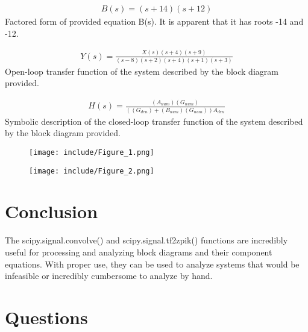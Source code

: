 \documentclass[12pt]{article}
\begin{document}
\begin{equation}
\begin{split}
B(s) = (s+14)(s+12)
\end{split}
\end{equation}
Factored form of provided equation B(s). It is apparent that it has roots -14 and -12.

\begin{equation}
\begin{split}
Y(s) = \frac{X(s)(s+4)(s+9)}{(s-8)(s+2)(s+4)(s+1)(s+3)}
\end{split}
\end{equation}
Open-loop transfer function of the system described by the block diagram provided.

\begin{equation}
\begin{split}
H(s) = \frac{(A_{num})(G_{num})}{( (G_{den}) + (B_{num})(G_{num}))A_{den}}
\end{split}
\end{equation}
Symbolic description of the closed-loop transfer function of the system described by the block diagram provided.

    \begin{figure}[hbt!]
        \centering
        \texttt{[image: include/Figure\_1.png]}
        \caption{}
    \end{figure}
    
    \begin{figure}[hbt!]
        \centering
        \texttt{[image: include/Figure\_2.png]}
        \caption{}
    \end{figure}
    
\newpage
\section*{Conclusion}
\par The scipy.signal.convolve() and scipy.signal.tf2zpik() functions are incredibly useful for processing and analyzing block diagrams and their component equations. With proper use, they can be used to analyze systems that would be infeasible or incredibly cumbersome to analyze by hand.


\newpage
\section*{Questions}
\end{document}
